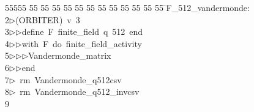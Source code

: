 %
%
\begin{tabbing}
55555 \= 55 \= 55 \= 55 \= 55 \= 55 \= 55 \= 55 \= 55 \= 55 \= 55 \= 55 \= 55 \= \>F\_512\_vandermonde:\\[0pt]
2\>$\triangleright$\>(ORBITER)\ v\ 3\ \\[0pt]
3\>$\triangleright$\>$\triangleright$\>define\ F\ finite\_field\ q\ 512\ end\ \\[0pt]
4\>$\triangleright$\>$\triangleright$\>with\ F\ do\ finite\_field\_activity\ \\[0pt]
5\>$\triangleright$\>$\triangleright$\>$\triangleright$\>Vandermonde\_matrix\ \\[0pt]
6\>$\triangleright$\>$\triangleright$\>end\\[0pt]
7\>$\triangleright$\>\ rm\ Vandermonde\_q512csv\\[0pt]
8\>$\triangleright$\>\ rm\ Vandermonde\_q512\_invcsv\\[0pt]
9\>\end{tabbing}
